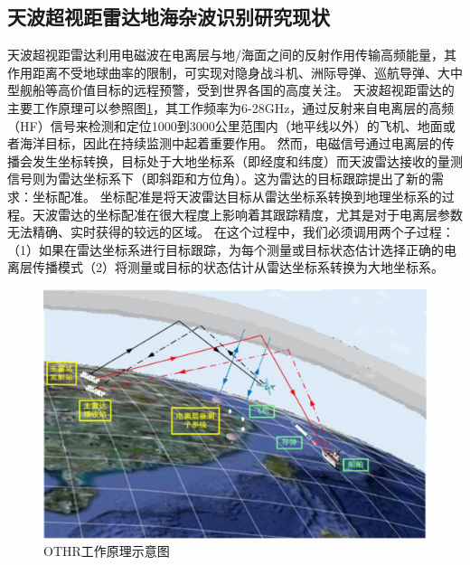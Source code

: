 \subsection{天波超视距雷达地海杂波识别研究现状}
天波超视距雷达利用电磁波在电离层与地/海面之间的反射作用传输高频能量，其作用距离不受地球曲率的限制，可实现对隐身战斗机、洲际导弹、巡航导弹、大中型舰船等高价值目标的远程预警，受到世界各国的高度关注。
天波超视距雷达的主要工作原理可以参照图\ref{fig:othr_how}，其工作频率为6-28GHz，通过反射来自电离层的高频（HF）信号来检测和定位1000到3000公里范围内（地平线以外）的飞机、地面或者海洋目标，因此在持续监测中起着重要作用\cite{headrick1974over, fabrizio2013high}。
然而，电磁信号通过电离层的传播会发生坐标转换，目标处于大地坐标系（即经度和纬度）而天波雷达接收的量测信号则为雷达坐标系下（即斜距和方位角）\cite{krolik1997maximum}。这为雷达的目标跟踪提出了新的需求：坐标配准。
坐标配准是将天波雷达目标从雷达坐标系转换到地理坐标系的过程。天波雷达的坐标配准在很大程度上影响着其跟踪精度，尤其是对于电离层参数无法精确、实时获得的较远的区域。
在这个过程中，我们必须调用两个子过程：（1）如果在雷达坐标系进行目标跟踪，为每个测量或目标状态估计选择正确的电离层传播模式（2）将测量或目标的状态估计从雷达坐标系转换为大地坐标系。
\begin{figure}[htb]
	\centering
	\includegraphics[width=\textwidth]{figures/introduction/othr_how_new}
	\caption{OTHR工作原理示意图}
	\label{fig:othr_how}
\end{figure}

